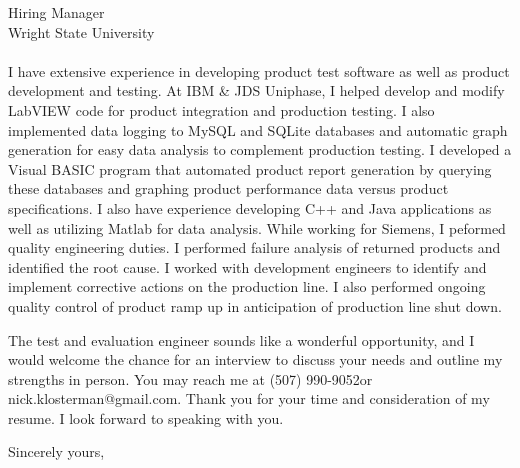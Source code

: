 \documentclass{letter} %
\makeatletter
\newcommand{\contactperson}{Hiring Manager}
\newcommand{\contactCompany}{Wright State University}
\newcommand{\contactStreetAddress}{ }  %
\newcommand{\contactCityStateZip}{ }
\newcommand{\position}{test and evaluation engineer }%
\newcommand{\personalphonenumber}{(507) 990-9052}
\newcommand{\personalemail}{nick.klosterman@gmail.com}
\makeatother
\begin{document}
\begin{letter}{\contactperson \\
\contactCompany \\
\contactStreetAddress \\
\contactCityStateZip

}
\noindent
I have extensive experience in developing product test software as well as product development and testing.
At IBM \& JDS Uniphase, I helped develop and modify LabVIEW code for product integration and production testing.
I also implemented data logging to MySQL and SQLite databases and automatic graph generation for easy data analysis to complement production testing.
I developed a Visual BASIC program that automated product report generation by querying these databases and graphing product performance data versus product specifications.
I also have experience developing C++ and Java applications as well as utilizing Matlab for data analysis.
While working for Siemens, I peformed quality engineering duties.
I performed failure analysis of returned products and identified the root cause. I worked with development engineers to identify and implement corrective actions on the production line.
I also performed ongoing quality control of product ramp up in anticipation of production line shut down.

 
\noindent 
The \position sounds like a wonderful opportunity, and I would welcome the chance for an interview to discuss your needs and outline my strengths in person. 
You may reach me at \personalphonenumber  or \personalemail.
Thank you for your time and consideration of my resume. I look forward to speaking with you.
 

\closing{Sincerely yours,} 
 

 

\end{letter}
 
\end{document}
